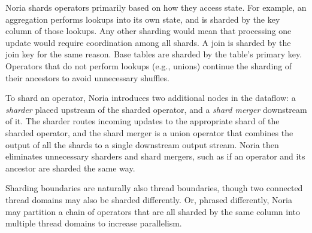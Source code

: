 Noria shards operators primarily based on how they access state. For example, an
aggregation performs lookups into its own state, and is sharded by the key
column of those lookups. Any other sharding would mean that processing one
update would require coordination among all shards. A join is sharded by the
join key for the same reason. Base tables are sharded by the table's primary
key. Operators that do not perform lookups (e.g., unions) continue the sharding
of their ancestors to avoid unnecessary shuffles.

To shard an operator, Noria introduces two additional nodes in the dataflow: a
\emph{sharder} placed upstream of the sharded operator, and a \emph{shard
merger} downstream of it. The sharder routes incoming updates to the appropriate
shard of the sharded operator, and the shard merger is a union operator that
combines the output of all the shards to a single downstream output stream.
Noria then eliminates unnecessary sharders and shard mergers, such as if an
operator and its ancestor are sharded the same way.

Sharding boundaries are naturally also thread boundaries, though two connected
thread domains may also be sharded differently. Or, phrased differently, Noria
may partition a chain of operators that are all sharded by the same column into
multiple thread domains to increase parallelism.

